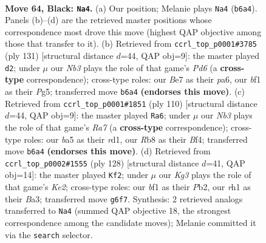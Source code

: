 \documentclass[11pt]{article}
\begin{document}
\clearpage

\begin{figure}[p]\centering
\begin{subfigure}{0.46\textwidth}\centering
\resizebox{\linewidth}{!}{%
\newchessgame
\chessboard[
  setfen={1r6/4b3/pn1p2kp/B3p3/4P2p/5P2/5K2/5B1R b - - 5 64},
  showmover=false,
  pgfstyle=straightmove, color=movearrow, markmove={b6-a4}
]}
\caption{}
\end{subfigure}\hfill
\begin{subfigure}{0.46\textwidth}\centering
\resizebox{\linewidth}{!}{%
\newchessgame
\chessboard[
  setfen={8/5pk1/P7/1K2p1p1/2B1P1P1/2bp1r2/R7/8 b - - 0 66},
  showmover=false,
  pgfstyle=straightmove, color=movearrow, markmove={d3-d2}
]}
\caption{}
\end{subfigure}
\\[4pt]
\begin{subfigure}{0.46\textwidth}\centering
\resizebox{\linewidth}{!}{%
\newchessgame
\chessboard[
  setfen={8/R7/3Pkbp1/5p1p/5B1P/6P1/5PK1/3r4 w - - 29 56},
  showmover=false,
  pgfstyle=straightmove, color=movearrow, markmove={a7-a6}
]}
\caption{}
\end{subfigure}\hfill
\begin{subfigure}{0.46\textwidth}\centering
\resizebox{\linewidth}{!}{%
\newchessgame
\chessboard[
  setfen={6k1/2rb2p1/5pP1/3R1P2/7p/Bp6/1P2K3/8 w - - 12 65},
  showmover=false,
  pgfstyle=straightmove, color=movearrow, markmove={e2-f2}
]}
\caption{}
\end{subfigure}
\caption{\textbf{Move 64, Black: \texttt{Na4}.} (a) Our position; Melanie plays \texttt{Na4} (\texttt{b6a4}). Panels (b)--(d) are the retrieved master positions whose correspondence most drove this move (highest QAP objective among those that transfer to it). (b) Retrieved from \texttt{ccrl\_top\_p0001\#3785} (ply 131) [structural distance $d$=44, QAP obj=9]: the master played \texttt{d2}; under $\mu$ our \emph{Nb3} plays the role of that game's \emph{Pd6} (a \textbf{cross-type} correspondence); cross-type roles: our \emph{B}e7 as their \emph{p}a6, our \emph{b}f1 as their \emph{P}g5; transferred move \texttt{b6a4} \textbf{(endorses this move)}. (c) Retrieved from \texttt{ccrl\_top\_p0001\#1851} (ply 110) [structural distance $d$=44, QAP obj=9]: the master played \texttt{Ra6}; under $\mu$ our \emph{Nb3} plays the role of that game's \emph{Ra7} (a \textbf{cross-type} correspondence); cross-type roles: our \emph{b}a5 as their \emph{r}d1, our \emph{R}b8 as their \emph{B}f4; transferred move \texttt{b6a4} \textbf{(endorses this move)}. (d) Retrieved from \texttt{ccrl\_top\_p0002\#1555} (ply 128) [structural distance $d$=41, QAP obj=14]: the master played \texttt{Kf2}; under $\mu$ our \emph{Kg3} plays the role of that game's \emph{Ke2}; cross-type roles: our \emph{b}f1 as their \emph{P}b2, our \emph{r}h1 as their \emph{B}a3; transferred move \texttt{g6f7}. Synthesis: 2 retrieved analogs transferred to \texttt{Na4} (summed QAP objective 18, the strongest correspondence among the candidate moves); Melanie committed it via the \texttt{search} selector.}
\label{fig:thought-m127}
\end{figure}
\end{document}
